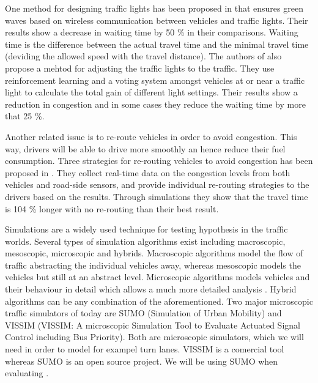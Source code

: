 One method for designing traffic lights has been proposed in \cite{SOTL} that ensures green waves based on wireless communication between vehicles and traffic lights. 
Their results show a decrease in waiting time by 50 \% in their comparisons. 
Waiting time is the difference between the actual travel time and the minimal travel time (deviding the allowed speed with the travel distance).
The authors of \cite{ITLC} also propose a mehtod for adjusting the traffic lights to the traffic. 
They use reinforcement learning and a voting system amongst vehicles at or near a traffic light to calculate the total gain of different light settings. 
Their results show a reduction in congestion and in some cases they reduce the waiting time by more that 25 \%.

Another related issue is to re-route vehicles in order to avoid congestion. 
This way, drivers will be able to drive more smoothly an hence reduce their fuel consumption. 
Three strategies for re-routing vehicles to avoid congestion has been proposed in \cite{congestionAvoidance}. 
They collect real-time data on the congestion levels from both vehicles and road-side sensors, and provide individual re-routing strategies to the drivers based on the results. 
Through simulations they show that the travel time is 104 \% longer with no re-routing than their best result.

Simulations are a widely used technique for testing hypothesis in the traffic worlds.
Several types of simulation algorithms exist including macroscopic, mesoscopic, microscopic and hybrids.
Macroscopic algorithms model the flow of traffic abstracting the individual vehicles away, whereas mesoscopic models the vehicles but still at an abstract level. 
Microscopic algorithms models vehicles and their behaviour in detail which allows a much more detailed analysis \cite{meso-micro}. 
Hybrid algorithms can be any combination of the aforementioned.
Two major microscopic traffic simulators of today are SUMO (Simulation of Urban Mobility)\cite{sumo} and VISSIM (VISSIM: A microscopic Simulation Tool to Evaluate Actuated Signal Control including Bus Priority)\cite{vissim}.
Both are microscopic simulators, which we will need in order to model for exampel turn lanes.
VISSIM is a comercial tool whereas SUMO is an open source project.
We will be using SUMO when evaluating \tech.








